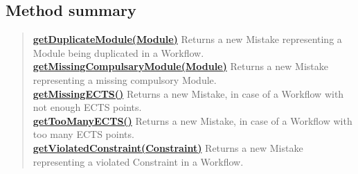 \documentclass[11pt,a4paper]{report}
\begin{document}
{{{{{{{{{{{			\subsection{Method summary}{
				\begin{verse}
					\hyperlink{studyplanning.model.mistake.Mistakes.getDuplicateModule(studyplanning.model.workflow.Module)}{{\bf getDuplicateModule(Module)}} Returns a new Mistake representing a Module being duplicated in a Workflow.\\
					\hyperlink{studyplanning.model.mistake.Mistakes.getMissingCompulsaryModule(studyplanning.model.workflow.Module)}{{\bf getMissingCompulsaryModule(Module)}} Returns a new Mistake representing a missing compulsory Module.\\
					\hyperlink{studyplanning.model.mistake.Mistakes.getMissingECTS()}{{\bf getMissingECTS()}} Returns a new Mistake, in case of a Workflow with not enough ECTS points.\\
					\hyperlink{studyplanning.model.mistake.Mistakes.getTooManyECTS()}{{\bf getTooManyECTS()}} Returns a new Mistake, in case of a Workflow with too many ECTS points.\\
					\hyperlink{studyplanning.model.mistake.Mistakes.getViolatedConstraint(studyplanning.model.workflow.constraint.Constraint)}{{\bf getViolatedConstraint(Constraint)}} Returns a new Mistake representing a violated Constraint in a Workflow.\\
				\end{verse}
			}

}}}}}}}}}}}
\end{document}
